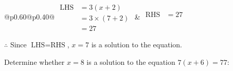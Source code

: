 \documentclass[12pt]{article}
\newcounter{minipagecount}
\begin{document}
\begin{multicols}{2}
\begin{minipage}[t]{0.40\textwidth}
    \renewcommand{\arraystretch}{1.3} %
    \begin{tabular}{@{}p{0.60\linewidth}@{}p{0.40\linewidth}@{}}
        \(\begin{aligned}
            \text{LHS} &= 3(x + 2) \\
                    &= 3 \times(7 + 2) \\
                    &= 27
        \end{aligned}\) &
        \(\begin{aligned}
            \text{RHS} &= 27\\
                    & \\
                    &
        \end{aligned}\)
    \end{tabular}
    \renewcommand{\arraystretch}{1.0} %
    \vspace{2pt}  %

    \noindent \(\therefore\) Since \(\text{LHS} = \text{RHS}\), \(x = 7\) is  a solution to the equation.

\end{minipage}

 \vspace*{16pt}
\newpage
\noindent{(\theminipagecount)}\hspace{0.1mm} %
\begin{minipage}[t]{0.40\textwidth} %

    \noindent Determine whether \(x = 8\) is a solution to the equation \(7(x + 6) = 77\):
    \vspace{4pt}  %

    \noindent


\end{minipage}
\end{multicols}
\end{document}
